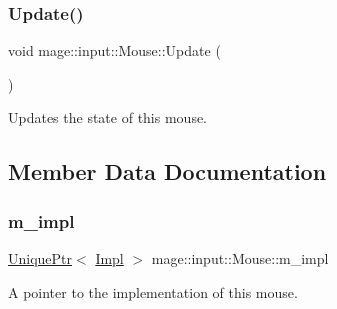 \subsubsection{\texorpdfstring{Update()}{Update()}}
{\footnotesize\ttfamily void mage\+::input\+::\+Mouse\+::\+Update (\begin{DoxyParamCaption}{ }\end{DoxyParamCaption})\hspace{0.3cm}{\ttfamily [noexcept]}}

Updates the state of this mouse. 

\subsection{Member Data Documentation}
\hypertarget{classmage_1_1input_1_1_mouse_a9056beca36df1fd7947cf7002aec99b6}{}\label{classmage_1_1input_1_1_mouse_a9056beca36df1fd7947cf7002aec99b6} 
\subsubsection{\texorpdfstring{m\+\_\+impl}{m\_impl}}
{\footnotesize\ttfamily \hyperlink{namespacemage_a3316d7143a973e37adf1110f2e80ca31}{Unique\+Ptr}$<$ \hyperlink{classmage_1_1input_1_1_mouse_1_1_impl}{Impl} $>$ mage\+::input\+::\+Mouse\+::m\+\_\+impl\hspace{0.3cm}{\ttfamily [private]}}

A pointer to the implementation of this mouse. 